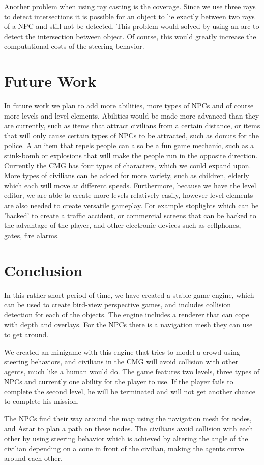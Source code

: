 \documentclass[a4paper,pdf,12pt]{article}
\begin{document}
Another problem when using ray casting is the coverage. Since we use three rays to detect intersections it is possible for an object to lie exactly between two rays of a NPC and still not be detected. This problem would solved by using an arc to detect the intersection between object. Of course, this would greatly increase the computational costs of the steering behavior.

\section{Future Work}
\label{sec:Future Work}
In future work we plan to add more abilities, more types of NPCs and of course more levels and level elements. Abilities would be made more advanced than they are currently, such as items that attract civilians from a certain distance, or items that will only cause certain types of NPCs to be attracted, such as donuts for the police. A an item that repels people can also be a fun game mechanic, such as a stink-bomb or explosions that will make the people run in the opposite direction. Currently the CMG has four types of characters, which we could expand upon. More types of civilians can be added for more variety, such as children, elderly which each will move at different speeds. Furthermore, because we have the level editor, we are able to create more levels relatively easily, however level elements are also needed to create versatile gameplay. For example stoplights which can be 'hacked' to create a traffic accident, or commercial screens that can be hacked to the advantage of the player, and other electronic devices such as cellphones, gates, fire alarms.

\section{Conclusion}
\label{sec:Conclusion}

In this rather short period of time, we have created a stable game engine, which can be used to create bird-view perspective games, and includes collision detection for each of the objects. The engine includes a renderer that can cope with depth and overlays. For the NPCs there is a navigation mesh they can use to get around. 

We created an minigame with this engine that tries to model a crowd using steering behaviors, and civilians in the CMG will avoid collision with other agents, much like a human would do. The game features two levels, three types of NPCs and currently one ability for the player to use. If the player fails to complete the second level, he will be terminated and will not get another chance to complete his mission.

The NPCs find their way around the map using the navigation mesh for nodes, and Astar to plan a path on these nodes. The civilians avoid collision with each other by using steering behavior which is achieved by altering the angle of the civilian depending on a cone in front of the civilian, making the agents curve around each other.




\end{document}
